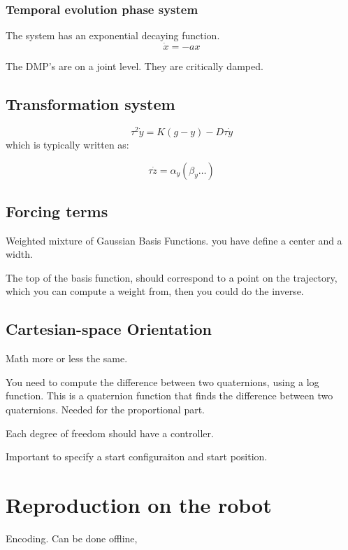 \documentclass[a4paper]{article}
\begin{document}
\subsubsection{Temporal evolution phase system}
The system has an exponential decaying function. 
\begin{equation}
\dot{x} = - a x
\end{equation}

The DMP's are on a joint level. They are critically damped. 


\subsection{Transformation system}
\begin{equation}
\tau^{2} \dot{y} = K (g - y) - D \tau \dot{y}
\end{equation}
which is typically written as:

\begin{equation}
	\tau \dot{z} = \alpha_{y} (\beta_y \hdots)
\end{equation}


\subsection{Forcing terms}
Weighted mixture of Gaussian Basis Functions.
you have define a center and a width. 

The top of the basis function, should correspond to a point on the trajectory, which you can compute a weight from, then you could do the inverse. 


\subsection{Cartesian-space Orientation}
Math more or less the same.

You need to compute the difference between two quaternions, using a log function. This is a quaternion function that finds the difference between two quaternions. Needed for the proportional part.

Each degree of freedom should have a controller.


Important to specify a start configuraiton and start position.


\section{Reproduction on the robot}
Encoding. Can be done offline, 
\end{document}
